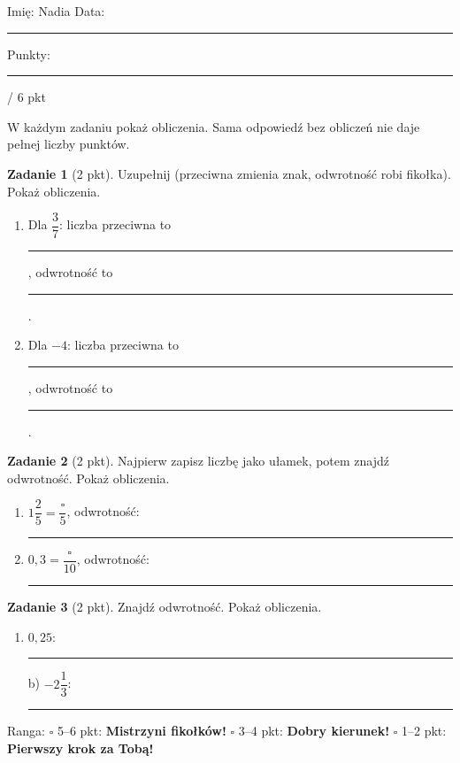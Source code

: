 \documentclass[11pt,a4paper]{article}
\begin{document}

\vspace{0.2em}
Imię: Nadia \hfill Data: \rule{3cm}{0.4pt} \hfill Punkty: \rule{1.2cm}{0.4pt} / 6 pkt

{\small W każdym zadaniu pokaż obliczenia. Sama odpowiedź bez obliczeń nie daje pełnej liczby punktów.}

\vspace{0.4em}

\textbf{Zadanie 1} (2 pkt). Uzupełnij (przeciwna zmienia znak, odwrotność robi fikołka). Pokaż obliczenia.
\begin{enumerate}[label=\alph*), leftmargin=*, itemsep=4pt]
  \item Dla $\dfrac{3}{7}$: liczba przeciwna to \rule{2.5cm}{0.4pt}, odwrotność to \rule{2.5cm}{0.4pt}.
  \item Dla $-4$: liczba przeciwna to \rule{2.5cm}{0.4pt}, odwrotność to \rule{2.5cm}{0.4pt}.
\end{enumerate}
\miejsce{3.8cm}

\textbf{Zadanie 2} (2 pkt). Najpierw zapisz liczbę jako ułamek, potem znajdź odwrotność. Pokaż obliczenia.
\begin{enumerate}[label=\alph*), leftmargin=*, itemsep=4pt]
  \item $1\dfrac{2}{5}=\dfrac{\square}{5}$, odwrotność: \rule{2.5cm}{0.4pt}
  \item $0{,}3=\dfrac{\square}{10}$, odwrotność: \rule{2.5cm}{0.4pt}
\end{enumerate}
\miejsce{4.4cm}

\textbf{Zadanie 3} (2 pkt). Znajdź odwrotność. Pokaż obliczenia.
\begin{enumerate}[label=\alph*), leftmargin=*, itemsep=4pt]
  \item $0{,}25$: \rule{2.5cm}{0.4pt} \hspace{1cm} b) $-2\dfrac{1}{3}$: \rule{2.5cm}{0.4pt}
\end{enumerate}
\miejsce{4.4cm}

\vfill
\begin{tcolorbox}[colback=white, colframe=cel, boxrule=0.6pt, arc=2pt]
Ranga: \quad $\square$ 5--6 pkt: \textbf{Mistrzyni fikołków!} \quad $\square$ 3--4 pkt: \textbf{Dobry kierunek!} \quad $\square$ 1--2 pkt: \textbf{Pierwszy krok za Tobą!}
\end{tcolorbox}
\end{document}
